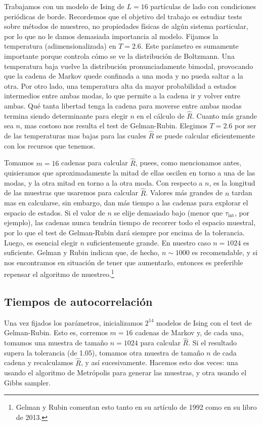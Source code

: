 \documentclass[a4paper, 12pt]{article}
\newcommand{\tauint}{\tau_\text{int}}
\begin{document}
Trabajamos con un modelo de Ising de $L = 16$ partículas de lado con condiciones periódicas de borde. Recordemos que el objetivo del trabajo es estudiar tests sobre métodos de muestreo, no propiedades físicas de algún sistema particular, por lo que no le damos demasiada importancia al modelo. Fijamos la temperatura (adimensionalizada) en $T = 2.6$. Este parámetro es sumamente importante porque controla cómo se ve la distribución de Boltzmann. Una temperatura baja vuelve la distribución pronunciadamente bimodal, provocando que la cadena de Markov quede confinada a una moda y no pueda saltar a la otra. Por otro lado, una temperatura alta da mayor probabilidad a estados intermedios entre ambas modas, lo que permite a la cadena ir y volver entre ambas. Qué tanta libertad tenga la cadena para moverse entre ambas modas termina siendo determinante para elegir $n$ en el cálculo de $\hat{R}$. Cuanto más grande sea $n$, mas costoso nos resulta el test de Gelman-Rubin. Elegimos $T = 2.6$ por ser de las temperaturas mas bajas para las cuales $\hat{R}$ se puede calcular eficientemente con los recursos que tenemos.

Tomamos $m = 16$ cadenas para calcular $\hat{R}$, puees, como mencionamos antes, quisieramos que aproximadamente la mitad de ellas oscilen en torno a una de las modas, y la otra mitad en torno a la otra moda. Con respecto a $n$, es la longitud de las muestras que usaremos para calcular $\hat{R}$. Valores más grandes de $n$ tardan mas en calcularse, sin embargo, dan más tiempo a las cadenas para explorar el espacio de estados. Si el valor de $n$ se elije demasiado bajo (menor que $\tauint$, por ejemplo), las cadenas nunca tendrán tiempo de recorrer todo el espacio muestral, por lo que el test de Gelman-Rubin dará siempre por encima de la tolerancia. Luego, es esencial elegir $n$ suficientemente grande. En nuestro caso $n = 1024$ es suficiente. Gelman y Rubin indican que, de hecho, $n \sim 1000$ es recomendable, y si nos encontramos en situación de tener que aumentarlo, entonces es preferible repensar el algoritmo de muestreo.\footnote{Gelman y Rubin comentan esto tanto en su artículo de 1992 como en su libro de 2013.}

\subsection{Tiempos de autocorrelación}

Una vez fijados los parámetros, inicializamos $2^{14}$ modelos de Ising con el test de Gelman-Rubin. Esto es, corremos $m = 16$ cadenas de Markov y, de cada una, tomamos una muestra de tamaño $n = 1024$ para calcular $\hat{R}$. Si el resultado supera la tolerancia (de 1.05), tomamos otra muestra de tamaño $n$ de cada cadena y recalculamos $\hat{R}$, y así sucesivamente. Hacemos esto dos veces: una usando el algoritmo de Metrópolis para generar las muestras, y otra usando el Gibbs sampler.\\
\end{document}

